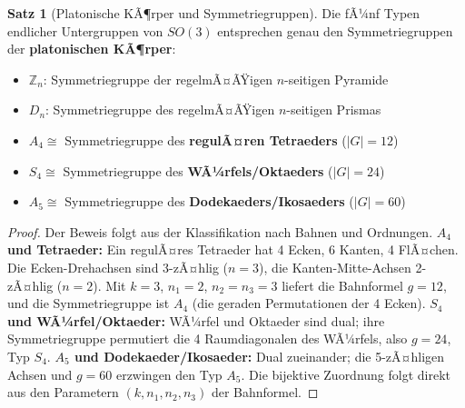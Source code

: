 ﻿\documentclass[a4paper,12pt]{report}
\theoremstyle{definition}
\newtheorem{satz}{Satz}
\begin{document}
\begin{satz}[Platonische KÃ¶rper und Symmetriegruppen]
    Die fÃ¼nf Typen endlicher Untergruppen von $SO(3)$ entsprechen
    genau den Symmetriegruppen der \textbf{platonischen KÃ¶rper}:
    \begin{itemize}
        \item[-] $\mathbb{Z}_n$: Symmetriegruppe der regelmÃ¤ÃŸigen $n$-seitigen Pyramide
        \item[-] $D_n$: Symmetriegruppe des regelmÃ¤ÃŸigen $n$-seitigen Prismas
        \item[-] $A_4 \cong$ Symmetriegruppe des \textbf{regulÃ¤ren Tetraeders} ($|G| = 12$)
        \item[-] $S_4 \cong$ Symmetriegruppe des \textbf{WÃ¼rfels/Oktaeders} ($|G| = 24$)
        \item[-] $A_5 \cong$ Symmetriegruppe des \textbf{Dodekaeders/Ikosaeders} ($|G| = 60$)
    \end{itemize}
\end{satz}
\begin{proof}
    Der Beweis folgt aus der Klassifikation nach Bahnen und Ordnungen.
    \textbf{$A_4$ und Tetraeder:} Ein regulÃ¤res Tetraeder hat 4 Ecken, 6 Kanten, 4 FlÃ¤chen.
    Die Ecken-Drehachsen sind 3-zÃ¤hlig ($n=3$), die Kanten-Mitte-Achsen 2-zÃ¤hlig ($n=2$).
    Mit $k=3$, $n_1=2$, $n_2=n_3=3$ liefert die Bahnformel $g=12$, und die
    Symmetriegruppe ist $A_4$ (die geraden Permutationen der 4 Ecken).
    \textbf{$S_4$ und WÃ¼rfel/Oktaeder:} WÃ¼rfel und Oktaeder sind dual; ihre
    Symmetriegruppe permutiert die 4 Raumdiagonalen des WÃ¼rfels, also $g=24$, Typ $S_4$.
    \textbf{$A_5$ und Dodekaeder/Ikosaeder:} Dual zueinander; die 5-zÃ¤hligen
    Achsen und $g=60$ erzwingen den Typ $A_5$. Die bijektive Zuordnung
    folgt direkt aus den Parametern $(k, n_1, n_2, n_3)$ der Bahnformel.
\end{proof}
\end{document}
